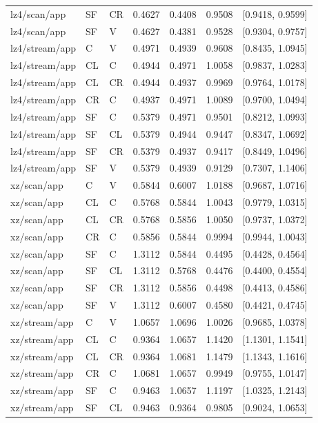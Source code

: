\begin{longtable}{lllrrrr}
lz4/scan/app & SF & CR & 0.4627 & 0.4408 & 0.9508 & [0.9418, 0.9599] \\
lz4/scan/app & SF & V & 0.4627 & 0.4381 & 0.9528 & [0.9304, 0.9757] \\
lz4/stream/app & C & V & 0.4971 & 0.4939 & 0.9608 & [0.8435, 1.0945] \\
lz4/stream/app & CL & C & 0.4944 & 0.4971 & 1.0058 & [0.9837, 1.0283] \\
lz4/stream/app & CL & CR & 0.4944 & 0.4937 & 0.9969 & [0.9764, 1.0178] \\
lz4/stream/app & CR & C & 0.4937 & 0.4971 & 1.0089 & [0.9700, 1.0494] \\
lz4/stream/app & SF & C & 0.5379 & 0.4971 & 0.9501 & [0.8212, 1.0993] \\
lz4/stream/app & SF & CL & 0.5379 & 0.4944 & 0.9447 & [0.8347, 1.0692] \\
lz4/stream/app & SF & CR & 0.5379 & 0.4937 & 0.9417 & [0.8449, 1.0496] \\
lz4/stream/app & SF & V & 0.5379 & 0.4939 & 0.9129 & [0.7307, 1.1406] \\
xz/scan/app & C & V & 0.5844 & 0.6007 & 1.0188 & [0.9687, 1.0716] \\
xz/scan/app & CL & C & 0.5768 & 0.5844 & 1.0043 & [0.9779, 1.0315] \\
xz/scan/app & CL & CR & 0.5768 & 0.5856 & 1.0050 & [0.9737, 1.0372] \\
xz/scan/app & CR & C & 0.5856 & 0.5844 & 0.9994 & [0.9944, 1.0043] \\
xz/scan/app & SF & C & 1.3112 & 0.5844 & 0.4495 & [0.4428, 0.4564] \\
xz/scan/app & SF & CL & 1.3112 & 0.5768 & 0.4476 & [0.4400, 0.4554] \\
xz/scan/app & SF & CR & 1.3112 & 0.5856 & 0.4498 & [0.4413, 0.4586] \\
xz/scan/app & SF & V & 1.3112 & 0.6007 & 0.4580 & [0.4421, 0.4745] \\
xz/stream/app & C & V & 1.0657 & 1.0696 & 1.0026 & [0.9685, 1.0378] \\
xz/stream/app & CL & C & 0.9364 & 1.0657 & 1.1420 & [1.1301, 1.1541] \\
xz/stream/app & CL & CR & 0.9364 & 1.0681 & 1.1479 & [1.1343, 1.1616] \\
xz/stream/app & CR & C & 1.0681 & 1.0657 & 0.9949 & [0.9755, 1.0147] \\
xz/stream/app & SF & C & 0.9463 & 1.0657 & 1.1197 & [1.0325, 1.2143] \\
xz/stream/app & SF & CL & 0.9463 & 0.9364 & 0.9805 & [0.9024, 1.0653] \\

\end{longtable}
